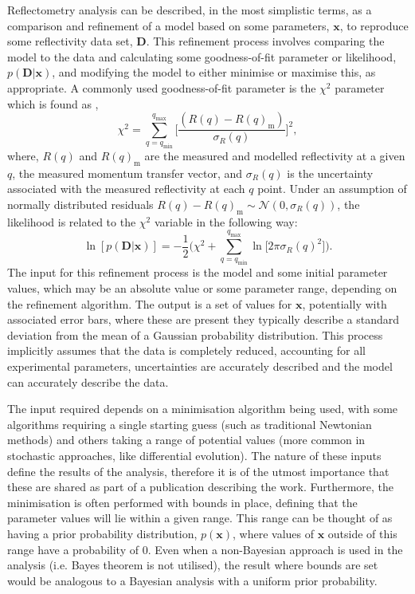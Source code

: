 \documentclass[reprint,superscriptaddress,aps,amsmath,linenumbers]{revtex4-2}
\begin{document}
Reflectometry analysis can be described, in the most simplistic terms, as a comparison and refinement of a model based on some parameters, $\mathbf{x}$, to reproduce some reflectivity data set, $\mathbf{D}$. 
This refinement process involves comparing the model to the data and calculating some goodness-of-fit parameter or likelihood, $p(\mathbf{D} | \mathbf{x})$, and modifying the model to either minimise or maximise this, as appropriate. 
A commonly used goodness-of-fit parameter is the $\chi^2$ parameter which is found as \cite{nelson_refnx_2019}, 
%
\begin{equation}
    \chi^2 = \sum_{q=q_{\text{min}}}^{q_{\text{max}}}{\bigg[\frac{(R(q) - R(q)_{\text{m}})}{\sigma_R(q)}\bigg]^2}, 
\end{equation}
%
where, $R(q)$ and $R(q)_{\text{m}}$ are the measured and modelled reflectivity at a given $q$, the measured momentum transfer vector, and $\sigma_R(q)$ is the uncertainty associated with the measured reflectivity at each $q$ point. 
Under an assumption of normally distributed residuals $R(q) - R(q)_{\text{m}} \sim \mathcal{N}(0, \sigma_R(q))$, the likelihood is related to the $\chi^2$ variable in the following way:
%
\begin{equation}
    \ln[p(\mathbf{D} | \mathbf{x})] = -\frac{1}{2} \bigg(\chi^2 + \sum_{q=q_{\text{min}}}^{q_{\text{max}}}\ln{\big[2\pi\sigma_R(q)^2\big]}\bigg).
    \label{equ:likelihood}
\end{equation}
%
The input for this refinement process is the model and some initial parameter values, which may be an absolute value or some parameter range, depending on the refinement algorithm. 
The output is a set of values for $\mathbf{x}$, potentially with associated error bars, where these are present they typically describe a standard deviation from the mean of a Gaussian probability distribution. 
This process implicitly assumes that the data is completely reduced, accounting for all experimental parameters, uncertainties are accurately described and the model can accurately describe the data. 

The input required depends on a minimisation algorithm being used, with some algorithms requiring a single starting guess (such as traditional Newtonian methods) and others taking a range of potential values (more common in stochastic approaches, like differential evolution). 
The nature of these inputs define the results of the analysis, therefore it is of the utmost importance that these are shared as part of a publication describing the work. 
Furthermore, the minimisation is often performed with bounds in place, defining that the parameter values will lie within a given range. 
This range can be thought of as having a prior probability distribution, $p(\mathbf{x})$, where values of $\mathbf{x}$ outside of this range have a probability of \num{0}. 
Even when a non-Bayesian approach is used in the analysis (i.e. Bayes theorem is not utilised), the result where bounds are set would be analogous to a Bayesian analysis with a uniform prior probability. 
\end{document}
